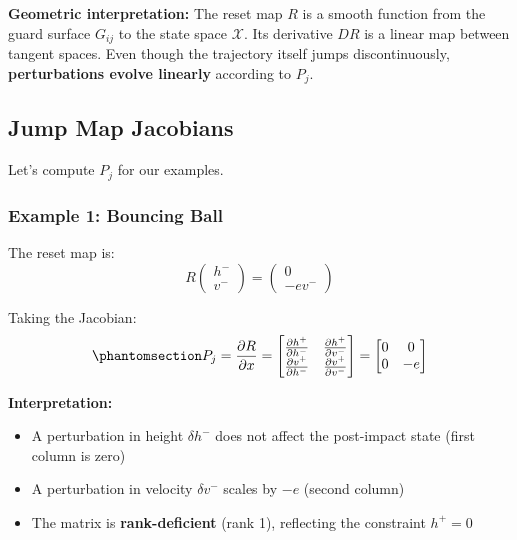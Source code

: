 \documentclass[
  letterpaper,
  DIV=11,
  numbers=noendperiod]{scrartcl}
\providecommand{\tightlist}{%
  \setlength{\itemsep}{0pt}\setlength{\parskip}{0pt}}\usepackage{longtable,booktabs,array}
\begin{document}
\textbf{Geometric interpretation:} The reset map \(R\) is a smooth
function from the guard surface \(G_{ij}\) to the state space
\(\mathcal{X}\). Its derivative \(DR\) is a linear map between tangent
spaces. Even though the trajectory itself jumps discontinuously,
\textbf{perturbations evolve linearly} according to \(P_j\).

\subsection{Jump Map Jacobians}\label{jump-map-jacobians}

Let's compute \(P_j\) for our examples.

\subsubsection{Example 1: Bouncing Ball}\label{example-1-bouncing-ball}

The reset map is: \[
R\begin{pmatrix} h^- \\ v^- \end{pmatrix} = \begin{pmatrix} 0 \\ -e v^- \end{pmatrix}
\]

Taking the Jacobian:
\begin{equation}\phantomsection\label{eq-ball-jacobian}{
P_j = \frac{\partial R}{\partial x} = \begin{bmatrix}
\frac{\partial h^+}{\partial h^-} & \frac{\partial h^+}{\partial v^-} \\
\frac{\partial v^+}{\partial h^-} & \frac{\partial v^+}{\partial v^-}
\end{bmatrix} = \begin{bmatrix}
0 & 0 \\
0 & -e
\end{bmatrix}
}\end{equation}

\textbf{Interpretation:}

\begin{itemize}
\tightlist
\item
  A perturbation in height \(\delta h^-\) does not affect the
  post-impact state (first column is zero)
\item
  A perturbation in velocity \(\delta v^-\) scales by \(-e\) (second
  column)
\item
  The matrix is \textbf{rank-deficient} (rank 1), reflecting the
  constraint \(h^+ = 0\)
\end{itemize}
\end{document}
